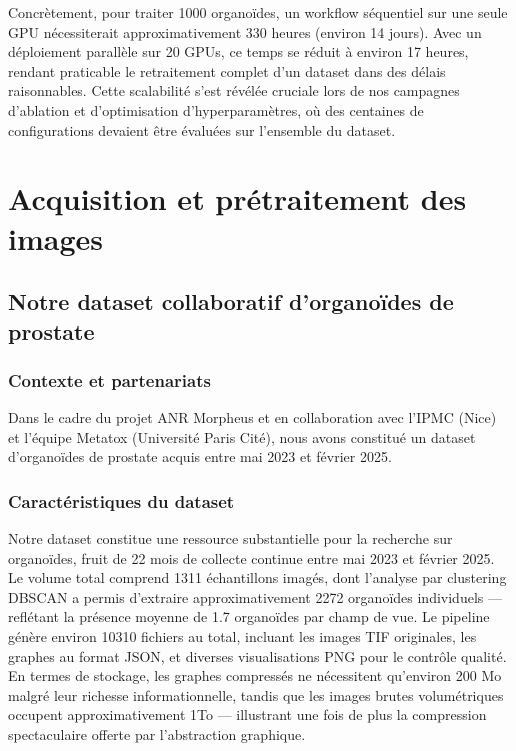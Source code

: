 Concrètement, pour traiter 1000 organoïdes, un workflow séquentiel sur une seule GPU nécessiterait approximativement 330 heures (environ 14 jours). Avec un déploiement parallèle sur 20 GPUs, ce temps se réduit à environ 17 heures, rendant praticable le retraitement complet d'un dataset dans des délais raisonnables. Cette scalabilité s'est révélée cruciale lors de nos campagnes d'ablation et d'optimisation d'hyperparamètres, où des centaines de configurations devaient être évaluées sur l'ensemble du dataset.

\section{Acquisition et prétraitement des images}

\subsection{Notre dataset collaboratif d'organoïdes de prostate}

\subsubsection{Contexte et partenariats}

Dans le cadre du projet ANR Morpheus et en collaboration avec l'IPMC (Nice) et l'équipe Metatox (Université Paris Cité), nous avons constitué un dataset d'organoïdes de prostate acquis entre mai 2023 et février 2025.

\subsubsection{Caractéristiques du dataset}

Notre dataset constitue une ressource substantielle pour la recherche sur organoïdes, fruit de 22 mois de collecte continue entre mai 2023 et février 2025. Le volume total comprend 1311 échantillons imagés, dont l'analyse par clustering DBSCAN a permis d'extraire approximativement 2272 organoïdes individuels — reflétant la présence moyenne de 1.7 organoïdes par champ de vue. Le pipeline génère environ 10310 fichiers au total, incluant les images TIF originales, les graphes au format JSON, et diverses visualisations PNG pour le contrôle qualité. En termes de stockage, les graphes compressés ne nécessitent qu'environ 200 Mo malgré leur richesse informationnelle, tandis que les images brutes volumétriques occupent approximativement 1To — illustrant une fois de plus la compression spectaculaire offerte par l'abstraction graphique.

